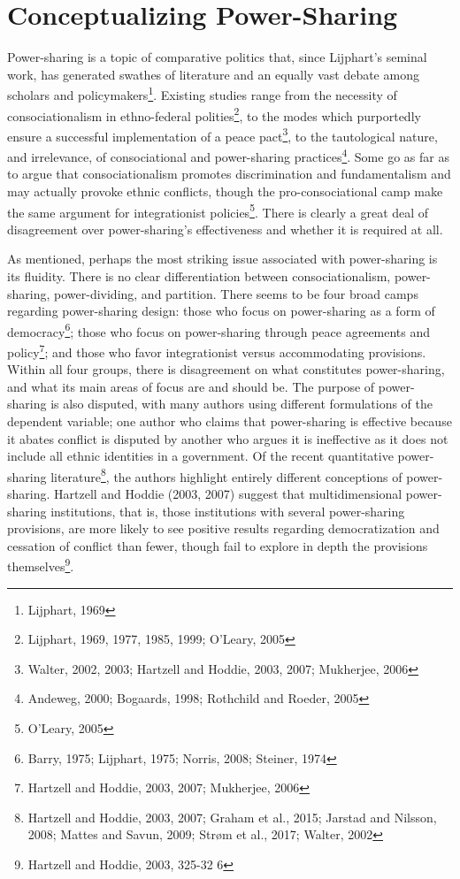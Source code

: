 \documentclass[12pt]{article}
\begin{document}
\section{Conceptualizing Power-Sharing} 
Power-sharing is a topic of comparative politics that, since Lijphart’s seminal work, has generated swathes of literature and an equally vast debate among scholars and policymakers\footnote{Lijphart, 1969}. Existing studies range from the necessity of consociationalism in ethno-federal polities\footnote{Lijphart, 1969, 1977, 1985, 1999; O’Leary, 2005}, to the modes which purportedly ensure a successful implementation of a peace pact\footnote{Walter, 2002, 2003; Hartzell and Hoddie, 2003, 2007; Mukherjee, 2006}, to the tautological nature, and irrelevance, of consociational and power-sharing practices\footnote{Andeweg, 2000; Bogaards, 1998; Rothchild and Roeder, 2005}. Some go as far as to argue that consociationalism promotes discrimination and fundamentalism and may actually provoke ethnic conflicts, though the pro-consociational camp make the same argument for integrationist policies\footnote{O’Leary, 2005}. There is clearly a great deal of disagreement over power-sharing’s effectiveness and whether it is required at all. 

As mentioned, perhaps the most striking issue associated with power-sharing is its fluidity. There is no clear differentiation between consociationalism, power-sharing, power-dividing, and partition. There seems to be four broad camps regarding power-sharing design: those who focus on power-sharing as a form of democracy\footnote{Barry, 1975; Lijphart, 1975; Norris, 2008; Steiner, 1974}; those who focus on power-sharing through peace agreements and policy\footnote{Hartzell and Hoddie, 2003, 2007; Mukherjee, 2006}; and those who favor integrationist versus accommodating provisions. Within all four groups, there is disagreement on what constitutes power-sharing, and what its main areas of focus are and should be. The purpose of power-sharing is also disputed, with many authors using different formulations of the dependent variable; one author who claims that power-sharing is effective because it abates conflict is disputed by another who argues it is ineffective as it does not include all ethnic identities in a government. Of the recent quantitative power-sharing literature\footnote{Hartzell and Hoddie, 2003, 2007; Graham et al., 2015; Jarstad and Nilsson, 2008; Mattes and Savun, 2009; Strøm et al., 2017; Walter, 2002}, the authors highlight entirely different conceptions of power-sharing. Hartzell and Hoddie (2003, 2007) suggest that multidimensional power-sharing institutions, that is, those institutions with several power-sharing provisions, are more likely to see positive results regarding democratization and cessation of conflict than fewer, though fail to explore in depth the provisions themselves\footnote{Hartzell and Hoddie, 2003, 325-32 6}. 
\end{document}
